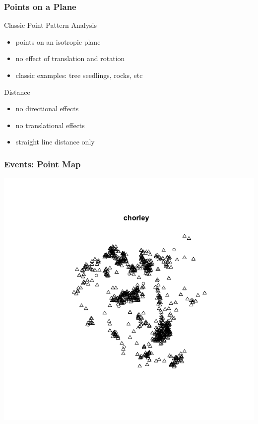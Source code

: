 \documentclass[nototal]{beamer}
\begin{document}
  \begin{frame}
    \frametitle{Points on a Plane}
    \begin{block}{Classic Point Pattern Analysis}
      \begin{itemize}
	\item points on an isotropic plane
	\item no effect of translation and rotation
	\item classic examples: tree seedlings, rocks, etc
      \end{itemize}
     \end{block}
     \begin{block}{Distance}
       \begin{itemize}
	 \item no directional effects
	 \item no translational effects
	  \item straight line distance only
       \end{itemize}
     \end{block}
   \end{frame}


\begin{frame}
     \frametitle{Events: Point Map}
     \begin{center}
       \includegraphics[width=.65\linewidth]{chorley.png}
     \end{center}
   \end{frame}
\end{document}
